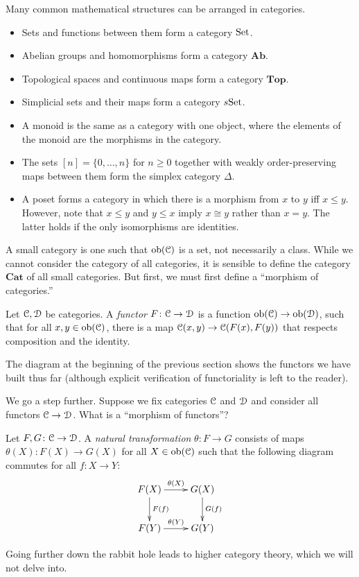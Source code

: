 \begin{example}
Many common mathematical structures can be arranged in categories.
\begin{itemize}
\item Sets and functions between them form a category ${\mathrm{Set}}$.
\item Abelian groups and homomorphisms form a category $\mathbf{Ab}$.
\item Topological spaces and continuous maps form a category $\mathbf{Top}$.
\item Simplicial sets and their maps form a category $s{\mathrm{Set}}$.
\item A monoid is the same as a category with one object, where the elements of the monoid are the morphisms in the category.
\item The sets $[n]=\{0,\ldots,n\}$ for $n\geq 0$ together with weakly order-preserving maps between them form the simplex category $\Delta$.
\item A poset forms a category in which there is a morphism from $x$ to $y$ iff $x\leq y$. However, note that $x\leq y$ and $y\leq x$ imply $x\cong y$ rather than $x=y$. The latter holds if the only isomorphisms are identities.
\end{itemize}
\end{example}
A small category is one such that $\mathrm{ob}(\mathcal C)$ is a set, not necessarily a class. While we cannot consider the category of all categories, it is sensible to define the category $\mathbf{Cat}$ of all small categories. But first, we must first define a ``morphism of categories.''
\begin{definition}
Let $\mathcal C,\mathcal D$ be categories. A \emph{functor} $F\colon\mathcal C\to\mathcal D$ is a function $\mathrm{ob}(\mathcal C)\to\mathrm{ob}(\mathcal D)$, such that for all $x,y\in\mathrm{ob}(\mathcal C)$, there is a map $\mathcal C(x,y)\to\mathcal C(F(x),F(y))$ that respects composition and the identity.
\end{definition}
The diagram at the beginning of the previous section shows the functors we have built thus far (although explicit verification of functoriality is left to the reader).

We go a step further. Suppose we fix categories $\mathcal C$ and $\mathcal D$ and consider all functors $\mathcal C\to\mathcal D$. What is a ``morphism of functors''?
\begin{definition}
Let $F,G\colon \mathcal C\to\mathcal D$. A \emph{natural transformation} $\theta\colon F\to G$ consists of maps $\theta(X)\colon F(X)\to G(X)$ for all $X\in\mathrm{ob}(\mathcal C)$ such that the following diagram commutes for all $f\colon X\to Y$:
\begin{equation*}
\xymatrix{F(X)\ar[d]^{F(f)}\ar[r]^{\theta(X)} & G(X)\ar[d]^{G(f)}\\
F(Y)\ar[r]^{\theta(Y)} & G(Y)}
\end{equation*}
\end{definition}
Going further down the rabbit hole leads to higher category theory, which we will not delve into.

